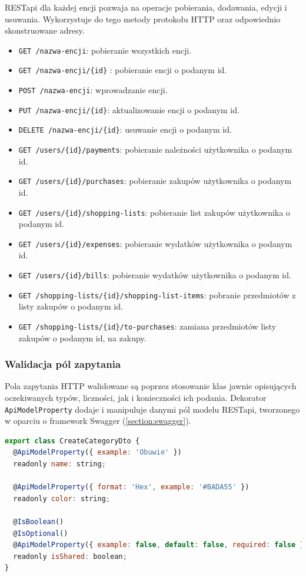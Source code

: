 RESTapi dla każdej encji pozwaja na operacje pobierania, dodawania, edycji i usuwania. Wykorzystuje do tego metody protokołu HTTP oraz odpowiednio skonstruowane adresy.

\begin{itemize}[noitemsep]
  \item \lstinline{GET /nazwa-encji}: pobieranie wszystkich encji.
  \item \lstinline|GET /nazwa-encji/{id}|
  : pobieranie encji o podanym id.
  \item \lstinline{POST /nazwa-encji}: wprowadzanie encji.
  \item \lstinline|PUT /nazwa-encji/{id}|: aktualizowanie encji o podanym id.
  \item \lstinline|DELETE /nazwa-encji/{id}|: usuwanie encji o podanym id.
  \item \lstinline|GET /users/{id}/payments|: pobieranie należności użytkownika o podanym id.
  \item \lstinline|GET /users/{id}/purchases|: pobieranie zakupów użytkownika o podanym id.
  \item \lstinline|GET /users/{id}/shopping-lists|: pobieranie list zakupów użytkownika o podanym id.
  \item \lstinline|GET /users/{id}/expenses|: pobieranie wydatków użytkownika o podanym id.
  \item \lstinline|GET /users/{id}/bills|: pobieranie wydatków użytkownika o podanym id.
  \item \lstinline|GET /shopping-lists/{id}/shopping-list-items|: pobranie przedmiotów z listy zakupów o podanym id.
  \item \lstinline|GET /shopping-lists/{id}/to-purchases|: zamiana przedmiotów listy zakupów o podanym id, na zakupy.
\end{itemize}

\subsubsection{Walidacja pól zapytania}
Pola zapytania HTTP walidowane są poprzez stosowanie klas jawnie opisujących oczekiwanych typów, liczności, jak i konieczności ich podania. Dekorator \lstinline{ApiModelProperty} dodaje i manipuluje danymi pól modelu RESTapi, tworzonego w oparciu o framework Swagger (\ref{section:swagger}).

\begin{lstlisting}[language=JavaScript, caption={Data transfer object dla operacji tworzenia instancji encji \lstinline{Category}.}, label=lst:shops_service]
export class CreateCategoryDto {
  @ApiModelProperty({ example: 'Obuwie' })
  readonly name: string;

  @ApiModelProperty({ format: 'Hex', example: '#BADA55' })
  readonly color: string;

  @IsBoolean()
  @IsOptional()
  @ApiModelProperty({ example: false, default: false, required: false })
  readonly isShared: boolean;
}
\end{lstlisting}

